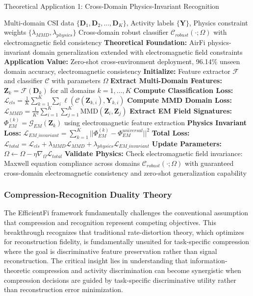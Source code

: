 \documentclass[journal]{IEEEtran}
\begin{document}
\begin{algorithm}[h]
\caption{Theoretical Application 1: Cross-Domain Physics-Invariant Recognition}
\label{alg:cross_domain_physics}
\begin{algorithmic}[1]
\REQUIRE Multi-domain CSI data $\{\mathbf{D}_1, \mathbf{D}_2, ..., \mathbf{D}_K\}$, Activity labels $\{\mathbf{Y}\}$, Physics constraint weights $\{\lambda_{MMD}, \lambda_{physics}\}$
\ENSURE Cross-domain robust classifier $\mathcal{C}_{robust}(\cdot; \Omega)$ with electromagnetic field consistency
\STATE \textbf{Theoretical Foundation:} AirFi physics-invariant domain generalization \cite{wang2022airfi} extended with electromagnetic field constraints
\STATE \textbf{Application Value:} Zero-shot cross-environment deployment, 96.14\% unseen domain accuracy, electromagnetic consistency
\STATE \textbf{Initialize:} Feature extractor $\mathcal{F}$ and classifier $\mathcal{C}$ with parameters $\Omega$
\STATE \textbf{Extract Multi-Domain Features:} $\mathbf{Z}_k = \mathcal{F}(\mathbf{D}_k)$ for all domains $k = 1, ..., K$
\STATE \textbf{Compute Classification Loss:} $\mathcal{L}_{cls} = \frac{1}{K} \sum_{k=1}^{K} \sum_{i} \ell(\mathcal{C}(\mathbf{Z}_{k,i}), \mathbf{Y}_{k,i})$
\STATE \textbf{Compute MMD Domain Loss:} $\mathcal{L}_{MMD} = \frac{1}{K^2} \sum_{i=1}^{K} \sum_{j=1}^{K} \text{MMD}(\mathbf{Z}_i, \mathbf{Z}_j)$
\STATE \textbf{Extract EM Field Signatures:} $\Phi_{EM}^{(k)} = \mathcal{G}_{EM}(\mathbf{Z}_k)$ using electromagnetic feature extraction
\STATE \textbf{Physics Invariant Loss:} $\mathcal{L}_{EM\_invariant} = \sum_{k=1}^{K} ||\Phi_{EM}^{(k)} - \Phi_{EM}^{universal}||^2$
\STATE \textbf{Total Loss:} $\mathcal{L}_{total} = \mathcal{L}_{cls} + \lambda_{MMD} \mathcal{L}_{MMD} + \lambda_{physics} \mathcal{L}_{EM\_invariant}$
\STATE \textbf{Update Parameters:} $\Omega \leftarrow \Omega - \eta \nabla_{\Omega} \mathcal{L}_{total}$
\STATE \textbf{Validate Physics:} Check electromagnetic field invariance: Maxwell equation compliance across domains
\RETURN $\mathcal{C}_{robust}(\cdot; \Omega)$ with guaranteed cross-domain electromagnetic consistency and zero-shot generalization capability
\end{algorithmic}
\end{algorithm}

\subsubsection{Compression-Recognition Duality Theory}

The EfficientFi framework \cite{chen2024efficientfi} fundamentally challenges the conventional assumption that compression and recognition represent competing objectives. This breakthrough recognizes that traditional rate-distortion theory, which optimizes for reconstruction fidelity, is fundamentally unsuited for task-specific compression where the goal is discriminative feature preservation rather than signal reconstruction. The critical insight lies in understanding that information-theoretic compression and activity discrimination can become synergistic when compression decisions are guided by task-specific discriminative utility rather than reconstruction error minimization.
\end{document}
